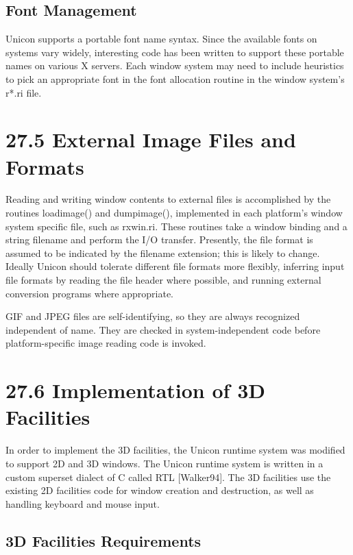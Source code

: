 \subsection{Font Management}

Unicon supports a portable font name syntax. Since the available fonts
on systems vary widely, {\textquotedbl}interesting{\textquotedbl} code
has been written to support these portable names on various X servers.
Each window system may need to include heuristics to pick an
appropriate font in the font allocation routine in the window system's
\textsf{r*.ri} file.

\section[27.5 External Image Files and Formats]{27.5 External Image Files and Formats}

Reading and writing window contents to external files is accomplished
by the routines \textsf{loadimage()} and \textsf{dumpimage()},
implemented in each platform's window system specific file, such as
\textsf{rxwin.ri}. These routines take a window binding and a string
filename and perform the I/O transfer. Presently, the file format is
assumed to be indicated by the filename extension; this is likely to
change. Ideally Unicon should tolerate different file formats more
flexibly, inferring input file formats by reading the file header
where possible, and running external conversion programs where
appropriate.

GIF and JPEG files are self-identifying, so they are always recognized
independent of name. They are checked in system-independent code
before platform-specific image reading code is invoked.


\section[27.6 Implementation of 3D Facilities]{27.6 Implementation of 3D Facilities}

In order to implement the 3D facilities, the Unicon runtime system was
modified to support 2D and 3D windows. The Unicon runtime system is
written in a custom superset dialect of C called RTL [Walker94]. The
3D facilities use the existing 2D facilities code for window creation
and destruction, as well as handling keyboard and mouse input.

\subsection[3D Facilities Requirements ]{\bfseries 3D Facilities Requirements }

